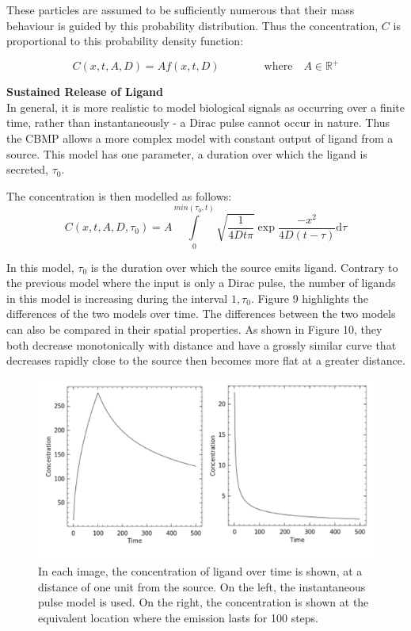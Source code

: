 \documentclass[12pt]{article}
\begin{document}
These particles are assumed to be sufficiently numerous that their mass 
behaviour is guided by this probability distribution. Thus the 
concentration, \(C\) is proportional to this probability density function:

\begin{equation}
  C(x,t,A,D) = Af(x,t,D) \qquad \qquad \text{where} \quad A \in \mathbb{R}^+
\end{equation}

{\bfseries Sustained Release of Ligand} \\
In general, it is more realistic to model biological signals as 
occurring over a finite time, rather than instantaneously - a Dirac 
pulse cannot occur in nature. Thus the CBMP allows a more complex model 
with constant output of ligand from a source. This model has one 
parameter, a duration over which the ligand is secreted, \(\tau_0\).

The concentration is then modelled as follows:
\begin{equation}
  C(x,t,A,D,\tau_0) = A\int\limits_0^{min(\tau_0,t)}\sqrt{\frac{1}{4Dt\pi}}\exp{\frac{-x^2}{4D(t-\tau)}}\mathrm{d}\tau
\end{equation}

In this model, \(\tau_0\) is the duration over which the 
source emits ligand. Contrary to the previous model where the input is 
only a Dirac pulse, the number of ligands in this model is increasing 
during the interval \(1,\tau_0\). Figure 9 
highlights the differences of the two models over time. The differences
between the two models can also be compared in their spatial properties. As
shown in Figure 10, they both decrease monotonically with distance and have
a grossly similar curve that decreases rapidly close to the source then
becomes more flat at a greater distance.

\begin{figure}[H]
\centering
\includegraphics[width=\textwidth]{media/sources.png}
\caption{In each image, the concentration of ligand over time is shown,
  at a distance of one unit from the source. On the left, the instantaneous
  pulse model is used. On the right, the concentration is shown at the
  equivalent location where the emission lasts for 100 steps.}
\end{figure}
\end{document}
